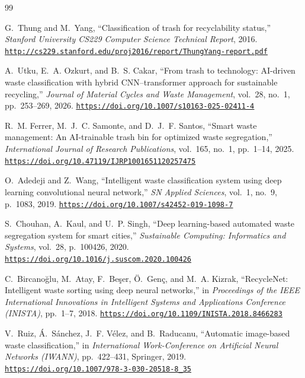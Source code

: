 \documentclass[11pt,a4paper]{article}
\newcommand{\paperurl}[1]{\href{#1}{\underline{\nolinkurl{#1}}}}
\begin{document}
\begin{thebibliography}{99}

G.~Thung and M.~Yang,
\newblock ``Classification of trash for recyclability status,''
\newblock \emph{Stanford University CS229 Computer Science Technical Report}, 2016.
\newblock \paperurl{http://cs229.stanford.edu/proj2016/report/ThungYang-report.pdf}

A.~Utku, E.~A. Ozkurt, and B.~S. Cakar,
\newblock ``From trash to technology: AI-driven waste classification with hybrid CNN--transformer approach for sustainable recycling,''
\newblock \emph{Journal of Material Cycles and Waste Management}, vol.~28, no.~1, pp.~253--269, 2026.
\newblock \paperurl{https://doi.org/10.1007/s10163-025-02411-4}

R.~M. Ferrer, M.~J.~C. Samonte, and D.~J.~F. Santos,
\newblock ``Smart waste management: An AI-trainable trash bin for optimized waste segregation,''
\newblock \emph{International Journal of Research Publications}, vol.~165, no.~1, pp.~1--14, 2025.
\newblock \paperurl{https://doi.org/10.47119/IJRP1001651120257475}

O.~Adedeji and Z.~Wang,
\newblock ``Intelligent waste classification system using deep learning convolutional neural network,''
\newblock \emph{SN Applied Sciences}, vol.~1, no.~9, p.~1083, 2019.
\newblock \paperurl{https://doi.org/10.1007/s42452-019-1098-7}

S.~Chouhan, A.~Kaul, and U.~P. Singh,
\newblock ``Deep learning-based automated waste segregation system for smart cities,''
\newblock \emph{Sustainable Computing: Informatics and Systems}, vol.~28, p.~100426, 2020.
\newblock \paperurl{https://doi.org/10.1016/j.suscom.2020.100426}

C.~Bircano\u{g}lu, M.~Atay, F.~Be\c{s}er, \"{O}.~Gen\c{c}, and M.~A. Kizrak,
\newblock ``RecycleNet: Intelligent waste sorting using deep neural networks,''
\newblock in \emph{Proceedings of the IEEE International Innovations in Intelligent Systems and Applications Conference (INISTA)}, pp.~1--7, 2018.
\newblock \paperurl{https://doi.org/10.1109/INISTA.2018.8466283}

V.~Ruiz, \'{A}.~S\'{a}nchez, J.~F. V\'{e}lez, and B.~Raducanu,
\newblock ``Automatic image-based waste classification,''
\newblock in \emph{International Work-Conference on Artificial Neural Networks (IWANN)}, pp.~422--431, Springer, 2019.
\newblock \paperurl{https://doi.org/10.1007/978-3-030-20518-8_35}


\end{thebibliography}
\end{document}
